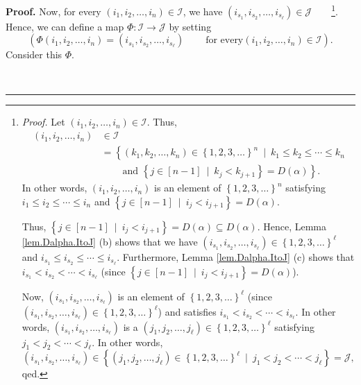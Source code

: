 \documentclass[numbers=enddot,12pt,final,onecolumn,notitlepage,abstracton]{scrartcl}
\theoremstyle{definition}
\newenvironment{proof}[1][Proof]{\noindent\textbf{#1.} }{\ \rule{0.5em}{0.5em}}
\newenvironment{verlong}{}{}
\begin{document}
\begin{verlong}
\begin{footnotesize}
\begin{proof}
Now, for every $\left(  i_{1},i_{2},\ldots,i_{n}\right)  \in\mathcal{I}$, we
have $\left(  i_{s_{1}},i_{s_{2}},\ldots,i_{s_{\ell}}\right)  \in\mathcal{J}%
$\ \ \ \ \footnote{\textit{Proof.} Let $\left(  i_{1},i_{2},\ldots
,i_{n}\right)  \in\mathcal{I}$. Thus,%
\begin{align*}
\left(  i_{1},i_{2},\ldots,i_{n}\right)   &  \in\mathcal{I}\\
&  =\left\{  \left(  k_{1},k_{2},\ldots,k_{n}\right)  \in\left\{
1,2,3,\ldots\right\}  ^{n}\ \mid\ k_{1}\leq k_{2}\leq\cdots\leq k_{n}\right.
\\
&  \ \ \ \ \ \ \ \ \ \ \left.  \text{and }\left\{  j\in\left[  n-1\right]
\ \mid\ k_{j}<k_{j+1}\right\}  =D\left(  \alpha\right)  \right\}  .
\end{align*}
In other words, $\left(  i_{1},i_{2},\ldots,i_{n}\right)  $ is an element of
$\left\{  1,2,3,\ldots\right\}  ^{n}$ satisfying $i_{1}\leq i_{2}\leq
\cdots\leq i_{n}$ and $\left\{  j\in\left[  n-1\right]  \ \mid\ i_{j}%
<i_{j+1}\right\}  =D\left(  \alpha\right)  $.
\par
Thus, $\left\{  j\in\left[  n-1\right]  \ \mid\ i_{j}<i_{j+1}\right\}
=D\left(  \alpha\right)  \subseteq D\left(  \alpha\right)  $. Hence, Lemma
\ref{lem.Dalpha.ItoJ} (b) shows that we have $\left(  i_{s_{1}},i_{s_{2}%
},\ldots,i_{s_{\ell}}\right)  \in\left\{  1,2,3,\ldots\right\}  ^{\ell}$ and
$i_{s_{1}}\leq i_{s_{2}}\leq\cdots\leq i_{s_{\ell}}$. Furthermore, Lemma
\ref{lem.Dalpha.ItoJ} (c) shows that $i_{s_{1}}<i_{s_{2}}<\cdots<i_{s_{\ell}}$
(since $\left\{  j\in\left[  n-1\right]  \ \mid\ i_{j}<i_{j+1}\right\}
=D\left(  \alpha\right)  $).
\par
Now, $\left(  i_{s_{1}},i_{s_{2}},\ldots,i_{s_{\ell}}\right)  $ is an element
of $\left\{  1,2,3,\ldots\right\}  ^{\ell}$ (since $\left(  i_{s_{1}}%
,i_{s_{2}},\ldots,i_{s_{\ell}}\right)  \in\left\{  1,2,3,\ldots\right\}
^{\ell}$) and satisfies $i_{s_{1}}<i_{s_{2}}<\cdots<i_{s_{\ell}}$. In other
words, $\left(  i_{s_{1}},i_{s_{2}},\ldots,i_{s_{\ell}}\right)  $ is a
$\left(  j_{1},j_{2},\ldots,j_{\ell}\right)  \in\left\{  1,2,3,\ldots\right\}
^{\ell}$ satisfying $j_{1}<j_{2}<\cdots<j_{\ell}$. In other words,%
\[
\left(  i_{s_{1}},i_{s_{2}},\ldots,i_{s_{\ell}}\right)  \in\left\{  \left(
j_{1},j_{2},\ldots,j_{\ell}\right)  \in\left\{  1,2,3,\ldots\right\}  ^{\ell
}\ \mid\ j_{1}<j_{2}<\cdots<j_{\ell}\right\}  =\mathcal{J},
\]
qed.}. Hence, we can define a map $\Phi:\mathcal{I}\rightarrow\mathcal{J}$ by
setting%
\[
\left(  \Phi\left(  i_{1},i_{2},\ldots,i_{n}\right)  =\left(  i_{s_{1}%
},i_{s_{2}},\ldots,i_{s_{\ell}}\right)  \ \ \ \ \ \ \ \ \ \ \text{for every
}\left(  i_{1},i_{2},\ldots,i_{n}\right)  \in\mathcal{I}\right)  .
\]
Consider this $\Phi$.


\end{proof}
\end{footnotesize}
\end{verlong}
\end{document}
